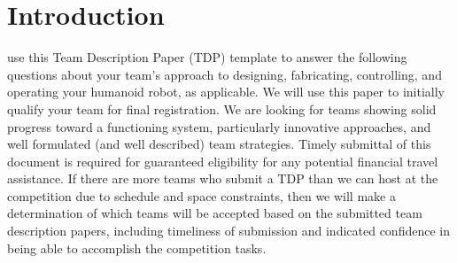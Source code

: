 \documentclass[journal]{IEEEtran}
\begin{document}
%
\IEEEpeerreviewmaketitle





\section{Introduction}
% 
% 
% 
% 

 use this Team Description Paper (TDP) template to answer the following questions about your team's approach to designing, fabricating, controlling, and operating your humanoid robot, as applicable. We will use this paper to initially qualify your team for final registration. We are looking for teams showing solid progress toward a functioning system, particularly innovative approaches, and well formulated (and well described) team strategies. Timely submittal of this document is required for guaranteed eligibility for any potential financial travel assistance. If there are more teams who submit a TDP than we can host at the competition due to schedule and space constraints, then we will make a determination of which teams will be accepted based on the submitted team description papers, including timeliness of submission and indicated confidence in being able to accomplish the competition tasks. 
\end{document}

